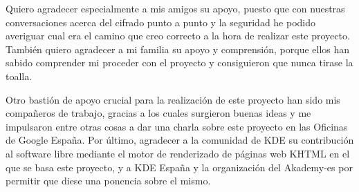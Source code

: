 Quiero agradecer especialmente a mis amigos su apoyo, puesto que con nuestras conversaciones acerca del cifrado punto a punto y la seguridad he podido averiguar cual era el camino que creo correcto a la hora de realizar este proyecto. También quiero agradecer a mi familia su apoyo y comprensión, porque ellos han sabido comprender mi proceder con el proyecto y consiguieron que nunca tirase la toalla.

Otro bastión de apoyo crucial para la realización de este proyecto han sido mis compañeros de trabajo, gracias a los cuales surgieron buenas ideas y me impulsaron entre otras cosas a dar una charla sobre este proyecto en las Oficinas de Google España. Por último, agradecer a la comunidad de KDE su contribución al software libre mediante el motor de renderizado de páginas web KHTML en el que se basa este proyecto, y a KDE España y la organización del Akademy-es por permitir que diese una ponencia sobre el mismo.